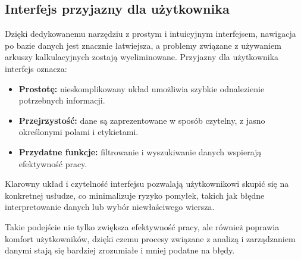 \subsection{Interfejs przyjazny dla użytkownika}
\begin{comment}Dedykowane narzędzie z prostym i intuicyjnym interfejsem znacząco ułatwia nawigację po bazie danych, eliminując problemy związane z tradycyjnymi rozwiązaniami, takimi jak arkusze kalkulacyjne. \end{comment} 

Dzięki dedykowanemu narzędziu z prostym i intuicyjnym interfejsem, nawigacja po bazie danych jest znacznie łatwiejsza, a problemy związane z używaniem arkuszy kalkulacyjnych zostają wyeliminowane. Przyjazny dla użytkownika interfejs oznacza:
\begin{itemize}
    \item \textbf{Prostotę:} nieskomplikowany układ umożliwia szybkie odnalezienie potrzebnych informacji.
    \item \textbf{Przejrzystość:} dane są zaprezentowane w sposób czytelny, z jasno określonymi polami i etykietami.
    \item \textbf{Przydatne funkcje:} filtrowanie i wyszukiwanie danych wspierają efektywność pracy.
\end{itemize}
Klarowny układ i czytelność interfejsu pozwalają użytkownikowi skupić się na konkretnej usłudze, co minimalizuje ryzyko pomyłek, takich jak błędne interpretowanie danych lub wybór niewłaściwego wiersza.

Takie podejście nie tylko zwiększa efektywność pracy, ale również poprawia komfort użytkowników, dzięki czemu procesy związane z analizą i zarządzaniem danymi stają się bardziej zrozumiałe i mniej podatne na błędy.